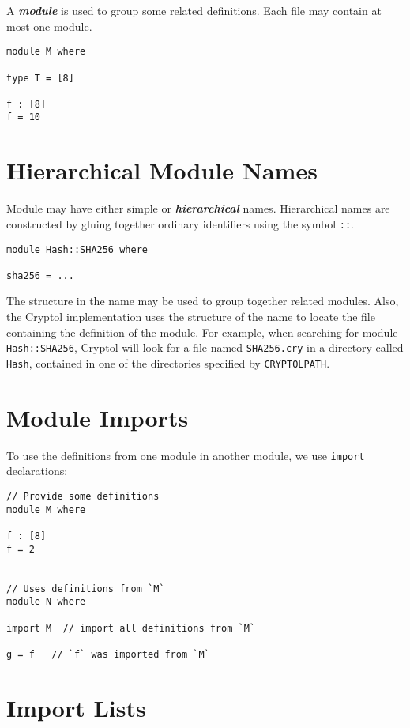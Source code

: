 A \textbf{\emph{module}} is used to group some related definitions.
Each file may contain at most one module.

\begin{verbatim}
module M where

type T = [8]

f : [8]
f = 10
\end{verbatim}

\hypertarget{hierarchical-module-names}{%
\section{Hierarchical Module Names}\label{hierarchical-module-names}}

Module may have either simple or \textbf{\emph{hierarchical}} names.
Hierarchical names are constructed by gluing together ordinary
identifiers using the symbol \texttt{::}.

\begin{verbatim}
module Hash::SHA256 where

sha256 = ...
\end{verbatim}

The structure in the name may be used to group together related modules.
Also, the Cryptol implementation uses the structure of the name to
locate the file containing the definition of the module. For example,
when searching for module \texttt{Hash::SHA256}, Cryptol will look for a
file named \texttt{SHA256.cry} in a directory called \texttt{Hash},
contained in one of the directories specified by \texttt{CRYPTOLPATH}.

\hypertarget{module-imports}{%
\section{Module Imports}\label{module-imports}}

To use the definitions from one module in another module, we use
\texttt{import} declarations:

\begin{verbatim}
// Provide some definitions
module M where

f : [8]
f = 2


// Uses definitions from `M`
module N where

import M  // import all definitions from `M`

g = f   // `f` was imported from `M`
\end{verbatim}

\hypertarget{import-lists}{%
\section{Import Lists}\label{import-lists}}

